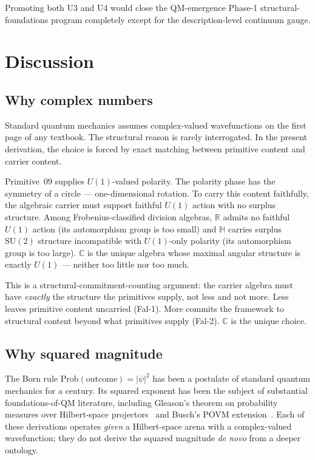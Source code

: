 \documentclass[11pt,a4paper]{article}
\begin{document}
Promoting both U3 and U4 would close the QM-emergence Phase-1 structural-foundations program completely except for the description-level continuum gauge.

\section{Discussion}\label{sec:discussion}

\subsection{Why complex numbers}

Standard quantum mechanics assumes complex-valued wavefunctions on the first page of any textbook. The structural reason is rarely interrogated. In the present derivation, the choice is forced by exact matching between primitive content and carrier content.

Primitive~09 supplies $U(1)$-valued polarity. The polarity phase has the symmetry of a circle --- one-dimensional rotation. To carry this content faithfully, the algebraic carrier must support faithful $U(1)$ action with no surplus structure. Among Frobenius-classified division algebras, $\mathbb{R}$ admits no faithful $U(1)$ action (its automorphism group is too small) and $\mathbb{H}$ carries surplus $\mathrm{SU}(2)$ structure incompatible with $U(1)$-only polarity (its automorphism group is too large). $\mathbb{C}$ is the unique algebra whose maximal angular structure is exactly $U(1)$ --- neither too little nor too much.

This is a structural-commitment-counting argument: the carrier algebra must have \emph{exactly} the structure the primitives supply, not less and not more. Less leaves primitive content uncarried (Fal-1). More commits the framework to structural content beyond what primitives supply (Fal-2). $\mathbb{C}$ is the unique choice.

\subsection{Why squared magnitude}

The Born rule $\mathrm{Prob}(\mathrm{outcome}) = |\psi|^2$ has been a postulate of standard quantum mechanics for a century. Its squared exponent has been the subject of substantial foundations-of-QM literature, including Gleason's theorem on probability measures over Hilbert-space projectors~\cite{gleason} and Busch's POVM extension~\cite{busch}. Each of these derivations operates \emph{given} a Hilbert-space arena with a complex-valued wavefunction; they do not derive the squared magnitude \emph{de novo} from a deeper ontology.
\end{document}
